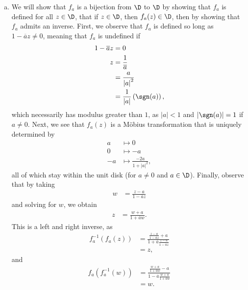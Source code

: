 \documentclass[10pt]{mypackage}
\begin{document}
\begin{solution}\hfill
  \begin{enumerate}[(a)]
    \item We will show that $f_a$ is a bijection from $\D$ to $\D$ by showing that $f_a$ is defined for all $z\in \D$, that if $z\in \D$, then $f_a(z) \in \D$, then by showing that $f_a$ admits an inverse. First, we observe that $f_a$ is defined so long as $1- \overline{a}z \neq 0$, meaning that $f_a$ is undefined if
      \begin{align*}
        1- \overline{a}z &= 0\\
        z &= \frac{1}{ \overline{a} }\\
          &= \frac{a}{\left\vert a \right\vert^2}\\
          &= \frac{1}{\left\vert a \right\vert} \left( \sgn(a) \right),
      \end{align*}
      which necessarily has modulus greater than $1$, as $\left\vert a \right\vert < 1$ and $\left\vert \sgn(a) \right\vert = 1$ if $a \neq 0$. Next, we see that $f_a(z)$ is a Möbius transformation that is uniquely determined by
      \begin{align*}
        a &\mapsto 0\\
        0 &\mapsto -a\\
        -a &\mapsto \frac{-2a}{1 + \left\vert a \right\vert^2},
      \end{align*}
      all of which stay within the unit disk (for $a\neq 0$ and $a\in \D$). Finally, observe that by taking
      \begin{align*}
        w &= \frac{z-a}{1- \overline{a}z}
      \end{align*}
      and solving for $w$, we obtain
      \begin{align*}
        z &= \frac{w+a}{1 + \overline{a}w}.
      \end{align*}
      This is a left and right inverse, as
      \begin{align*}
        f_a^{-1}\left( f_a(z) \right) &= \frac{\frac{z-a}{1- \overline{a}z} + a}{1 + \overline{a}\frac{z-a}{1- \overline{a}z}}\\
                                      &= z,
      \end{align*}
      and
      \begin{align*}
        f_a\left( f_a^{-1}\left( w \right) \right) &= \frac{\frac{w+a}{1 + \overline{a}w} - a}{1 - \overline{a}\frac{w+a}{1 + \overline{a}w}}\\
                                                   &= w.

\end{align*}
\end{enumerate}
\end{solution}
\end{document}
